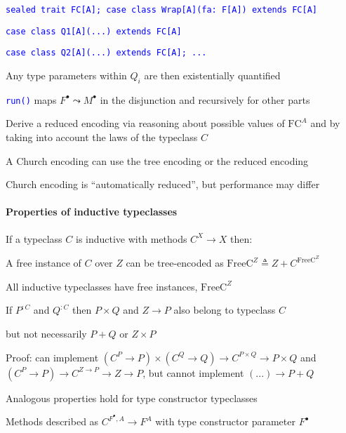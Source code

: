 \texttt{\textcolor{blue}{\footnotesize{}sealed trait FC{[}A{]}; case
class Wrap{[}A{]}(fa: F{[}A{]}) extends FC{[}A{]}}}{\footnotesize\par}

\texttt{\textcolor{blue}{\footnotesize{}case class Q1{[}A{]}(...)
extends FC{[}A{]}}}{\footnotesize\par}

\texttt{\textcolor{blue}{\footnotesize{}case class Q2{[}A{]}(...)
extends FC{[}A{]}; ...}}{\footnotesize\par}

Any type parameters within $Q_{i}$ are then existentially quantified

\texttt{\textcolor{blue}{\footnotesize{}run()}} maps $F^{\bullet}\leadsto M^{\bullet}$
in the disjunction and recursively for other parts

Derive a reduced encoding via reasoning about possible values of $\text{FC}^{A}$
and by taking into account the laws of the typeclass $C$

A Church encoding can use the tree encoding or the reduced encoding

Church encoding is \textsf{``}automatically reduced\textsf{''}, but performance may
differ


\paragraph{Properties of inductive typeclasses}

If a typeclass $C$ is inductive with methods $C^{X}\rightarrow X$
then:

A free instance of $C$ over $Z$ can be tree-encoded as {\footnotesize{}$\text{FreeC}^{Z}\triangleq Z+C^{\text{FreeC}^{Z}}$} 

All inductive typeclasses have free instances, $\text{FreeC}^{Z}$

If $P^{:C}$ and $Q^{:C}$ then $P\times Q$ and $Z\rightarrow P$
also belong to typeclass $C$

but not necessarily $P+Q$ or $Z\times P$

Proof: can implement $(C^{P}\rightarrow P)\times(C^{Q}\rightarrow Q)\rightarrow C^{P\times Q}\rightarrow P\times Q$
and $\left(C^{P}\rightarrow P\right)\rightarrow C^{Z\rightarrow P}\rightarrow Z\rightarrow P$,
but cannot implement $\left(...\right)\rightarrow P+Q$

Analogous properties hold for type constructor typeclasses

Methods described as $C^{F^{\bullet},A}\rightarrow F^{A}$ with type
constructor parameter $F^{\bullet}$

